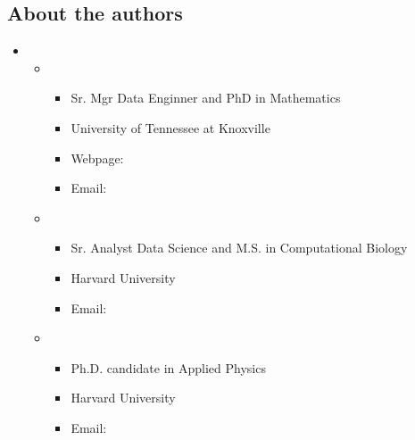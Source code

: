 \documentclass[letterpaper,11pt,english]{sphinxmanual}
\begin{document}
\subsection{About the authors}
\label{\detokenize{preface:about-the-authors}}\begin{itemize}
\item {} 
\sphinxAtStartPar
{}
\begin{itemize}
\item {} 
\sphinxAtStartPar
{}
\begin{itemize}
\item {} 
\sphinxAtStartPar
Sr. Mgr Data Enginner and PhD in Mathematics

\item {} 
\sphinxAtStartPar
University of Tennessee at Knoxville

\item {} 
\sphinxAtStartPar
Webpage: 

\item {} 
\sphinxAtStartPar
Email: 

\end{itemize}

\item {} 
\sphinxAtStartPar
{}
\begin{itemize}
\item {} 
\sphinxAtStartPar
Sr. Analyst \sphinxhyphen{} Data Science and M.S. in Computational Biology

\item {} 
\sphinxAtStartPar
Harvard University

\item {} 
\sphinxAtStartPar
Email: 

\end{itemize}

\item {} 
\sphinxAtStartPar
{}
\begin{itemize}
\item {} 
\sphinxAtStartPar
Ph.D. candidate in Applied Physics

\item {} 
\sphinxAtStartPar
Harvard University

\item {} 
\sphinxAtStartPar
Email: 


\end{itemize}
\end{itemize}
\end{itemize}
\end{document}
